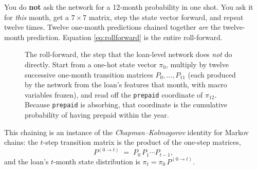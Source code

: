 \documentclass[11pt]{article}
\begin{document}
\begin{keyidea}
You do \textbf{not} ask the network for a 12-month probability in one shot. You ask it for
\emph{this} month, get a $7\times 7$ matrix, step the state vector forward, and repeat twelve
times. Twelve one-month predictions chained together \emph{are} the twelve-month prediction.
Equation \eqref{eq:rollforward} is the entire roll-forward.
\end{keyidea}

\begin{figure}[H]
\centering
{}
\caption{The roll-forward, the step that the loan-level network does \emph{not} do directly.
Start from a one-hot state vector $\pi_0$, multiply by twelve successive one-month transition
matrices $P_0,\dots,P_{11}$ (each produced by the network from the loan's features that month,
with macro variables frozen), and read off the \texttt{prepaid} coordinate of $\pi_{12}$.
Because \texttt{prepaid} is absorbing, that coordinate is the cumulative probability of having
prepaid within the year.}
\end{figure}

This chaining is an instance of the \emph{Chapman--Kolmogorov} identity for Markov chains: the
$t$-step transition matrix is the product of the one-step matrices,
\begin{equation}
  P^{(0\to t)} \;=\; P_0\,P_1\cdots P_{t-1},
  \label{eq:chapman}
\end{equation}
and the loan's $t$-month state distribution is $\pi_t = \pi_0\, P^{(0\to t)}$.
\end{document}
